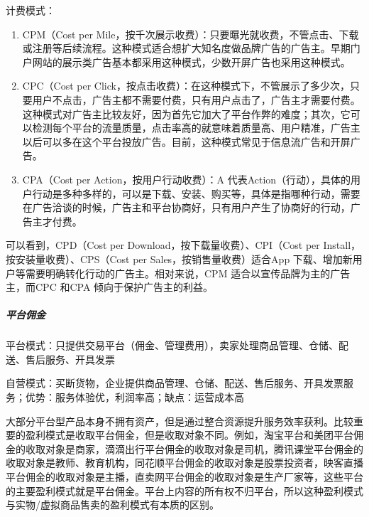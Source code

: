 \documentclass[letterpaper,11pt,english]{sphinxmanual}
\begin{document}
计费模式：
\begin{enumerate}
%
\item {} 
CPM（Cost per
Mile，按千次展示收费）：只要曝光就收费，不管点击、下载或注册等后续流程。这种模式适合想扩大知名度做品牌广告的广告主。早期门户网站的展示类广告基本都采用这种模式，少数开屏广告也采用这种模式。

\item {} 
CPC（Cost per
Click，按点击收费）：在这种模式下，不管展示了多少次，只要用户不点击，广告主都不需要付费，只有用户点击了，广告主才需要付费。这种模式对广告主比较友好，因为首先它加大了平台作弊的难度；其次，它可以检测每个平台的流量质量，点击率高的就意味着质量高、用户精准，广告主以后可以多在这个平台投放广告。目前，这种模式常见于信息流广告和开屏广告。

\item {} 
CPA（Cost per Action，按用户行动收费）：A
代表Action（行动），具体的用户行动是多种多样的，可以是下载、安装、购买等，具体是指哪种行动，需要在广告洽谈的时候，广告主和平台协商好，只有用户产生了协商好的行动，广告主才付费。

\end{enumerate}

可以看到，CPD（Cost per Download，按下载量收费）、CPI（Cost per
Install，按安装量收费）、CPS（Cost per Sales，按销售量收费）适合App
下载、增加新用户等需要明确转化行动的广告主。相对来说，CPM
适合以宣传品牌为主的广告主，而CPC 和CPA 倾向于保护广告主的利益。


\subparagraph{平台佣金}
\label{\detokenize{chapter_introduction/money:id10}}
平台模式：只提供交易平台（佣金、管理费用），卖家处理商品管理、仓储、配送、售后服务、开具发票

自营模式：买断货物，企业提供商品管理、仓储、配送、售后服务、开具发票服务；优势：服务体验优，利润率高；缺点：运营成本高

大部分平台型产品本身不拥有资产，但是通过整合资源提升服务效率获利。比较重要的盈利模式是收取平台佣金，但是收取对象不同。例如，淘宝平台和美团平台佣金的收取对象是商家，滴滴出行平台佣金的收取对象是司机，腾讯课堂平台佣金的收取对象是教师、教育机构，同花顺平台佣金的收取对象是股票投资者，映客直播平台佣金的收取对象是主播，直卖网平台佣金的收取对象是生产厂家等，这些平台的主要盈利模式就是平台佣金。平台上内容的所有权不归平台，所以这种盈利模式与实物/虚拟商品售卖的盈利模式有本质的区别。
\end{document}
